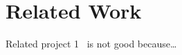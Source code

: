 \section{Related Work}
\label{sec:related}

Related project 1~\cite{relproj1} is not good because\ldots
